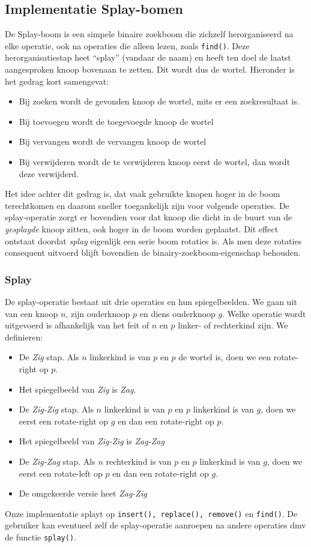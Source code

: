 \documentclass[a4paper,10pt]{article}
\begin{document}
\subsection{Implementatie Splay-bomen}

De Splay-boom is een simpele binaire zoekboom die zichzelf herorganiseerd na elke operatie, ook na operaties die alleen lezen, zoals \texttt{find()}. Deze herorganisatiestap heet ``splay'' (vandaar de naam) en heeft ten doel de laatst aangesproken knoop bovenaan te zetten. Dit wordt dus de wortel. Hieronder is het gedrag kort samengevat:
\begin{itemize}
\item Bij zoeken wordt de gevonden knoop de wortel, mits er een zoekresultaat is.
\item Bij toevoegen wordt de toegevoegde knoop de wortel
\item Bij vervangen wordt de vervangen knoop de wortel
\item Bij verwijderen wordt de te verwijderen knoop eerst de wortel, dan wordt deze verwijderd.
\end{itemize}
Het idee achter dit gedrag is, dat vaak gebruikte knopen hoger in de boom terechtkomen en daarom sneller toegankelijk zijn voor volgende operaties. De splay-operatie zorgt er bovendien voor dat knoop die dicht in de buurt van de \emph{gesplayde} knoop zitten, ook hoger in
de boom worden geplaatst. Dit effect ontstaat doordat \emph{splay} eigenlijk een serie boom rotaties is. Als men deze rotaties
consequent uitvoerd blijft bovendien de binairy-zoekboom-eigenschap behouden.

\subsubsection{Splay}

De splay-operatie bestaat uit drie operaties en hun spiegelbeelden. We gaan uit van een knoop $n$, zijn ouderknoop $p$ en diens ouderknoop $g$. Welke operatie wordt uitgevoerd is afhankelijk van het feit of $n$ en $p$ linker- of rechterkind zijn. We definieren:
\begin{itemize}
\item De \emph{Zig} stap. Als $n$ linkerkind is van $p$ en $p$ de wortel is, doen we een rotate-right op $p$.
\item Het spiegelbeeld van \emph{Zig} is \emph{Zag}.
\item De \emph{Zig-Zig} stap. Als $n$ linkerkind is van $p$ en $p$ linkerkind is van $g$, doen we eerst een rotate-right op $g$ en dan een rotate-right op $p$.
\item Het spiegelbeeld van \emph{Zig-Zig} is \emph{Zag-Zag}
\item De \emph{Zig-Zag} stap. Als $n$ rechterkind is van $p$ en $p$ linkerkind is van $g$, doen we eerst een rotate-left op $p$ en dan een rotate-right op $g$.
\item De omgekeerde versie heet \emph{Zag-Zig}
\end{itemize}
Onze implementatie splayt op \texttt{insert(), replace(), remove()} en \texttt{find()}. De gebruiker kan eventueel zelf de splay-operatie aanroepen na andere operaties dmv de functie \texttt{splay()}.
\end{document}
